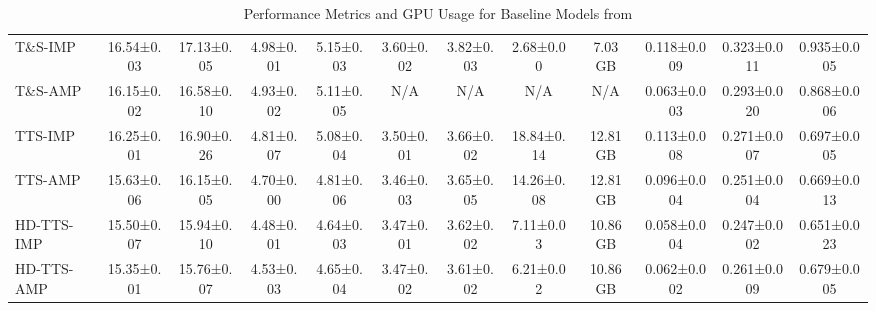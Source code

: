 \documentclass{article}
\theoremstyle{plain}
\theoremstyle{definition}
\theoremstyle{remark}
\begin{document}
\begin{table}[h!]
{\begin{tabular}{@{}lccccccccccc@{}}
T\&S-IMP         & 16.54±0.03        & 17.13±0.05         & 4.98±0.01        & 5.15±0.03         & 3.60±0.02        & 3.82±0.03         & 2.68±0.00         & 7.03 GB             & 0.118±0.009       & 0.323±0.011       & 0.935±0.005        \\
T\&S-AMP         & 16.15±0.02        & 16.58±0.10         & 4.93±0.02        & 5.11±0.05         & N/A              & N/A               & N/A               & N/A                 & 0.063±0.003       & 0.293±0.020       & 0.868±0.006        \\
TTS-IMP          & 16.25±0.01        & 16.90±0.26         & 4.81±0.07        & 5.08±0.04         & 3.50±0.01        & 3.66±0.02         & 18.84±0.14        & 12.81 GB            & 0.113±0.008       & 0.271±0.007       & 0.697±0.005        \\
TTS-AMP          & 15.63±0.06        & 16.15±0.05         & 4.70±0.00        & 4.81±0.06         & 3.46±0.03        & 3.65±0.05         & 14.26±0.08        & 12.81 GB            & 0.096±0.004       & 0.251±0.004       & 0.669±0.013        \\
HD-TTS-IMP       & 15.50±0.07        & 15.94±0.10         & 4.48±0.01        & 4.64±0.03         & 3.47±0.01        & 3.62±0.02         & 7.11±0.03         & 10.86 GB            & 0.058±0.004       & 0.247±0.002       & 0.651±0.023        \\
HD-TTS-AMP       & 15.35±0.01        & 15.76±0.07         & 4.53±0.03        & 4.65±0.04         & 3.47±0.02        & 3.61±0.02         & 6.21±0.02         & 10.86 GB            & 0.062±0.002       & 0.261±0.009       & 0.679±0.005        \\ \bottomrule
\end{tabular}%
}
\caption{Performance Metrics and GPU Usage for Baseline Models from \cite{marisca2024graph}}

\end{table}
\end{document}
